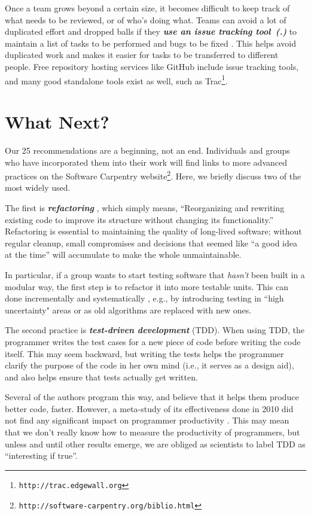 \documentclass{article}
\newcommand{\footurl}[1]{\footnote{\texttt{#1}}}
\newcounter{PracticeIdentifier}[section]
\newcommand{\practice}[1]{\stepcounter{PracticeIdentifier}\textbf{\emph{{#1}~(\arabic{section}.\arabic{PracticeIdentifier})}}}
\begin{document}
Once a team grows beyond a certain size, it becomes difficult to keep
track of what needs to be reviewed, or of who's doing what.  Teams can
avoid a lot of duplicated effort and dropped balls if they
\practice{use an issue tracking tool} to maintain a list of tasks to
be performed and bugs to be fixed \cite{dubois2003a}. This helps avoid
duplicated work and makes it easier for tasks to be transferred to
different people. Free repository hosting services like GitHub include
issue tracking tools, and many good standalone tools exist as well,
such as Trac\footurl{http://trac.edgewall.org}.

\section*{What Next?}

Our 25 recommendations are a beginning, not an end.  Individuals and
groups who have incorporated them into their work will find links to
more advanced practices on the Software Carpentry
website\footurl{http://software-carpentry.org/biblio.html}.  Here,
we briefly discuss two of the most widely used.

The first is \textbf{\emph{refactoring}}
\cite{fowler1999,kerievsky2004}, which simply means, ``Reorganizing
and rewriting existing code to improve its structure without changing
its functionality.''  Refactoring is essential to maintaining the
quality of long-lived software; without regular cleanup, small
compromises and decisions that seemed like ``a good idea at the time''
will accumulate to make the whole unmaintainable.

In particular, if a group wants to start testing software that
\emph{hasn't} been built in a modular way, the first step is to
refactor it into more testable units. This can done incrementally and
systematically \cite{feathers2004}, e.g., by introducing testing in
``high uncertainty" areas or as old algorithms are replaced with new
ones.

The second practice is \textbf{\emph{test-driven development}} (TDD).
When using TDD, the programmer writes the test cases for a new piece
of code before writing the code itself.  This may seem backward, but
writing the tests helps the programmer clarify the purpose of the code
in her own mind (i.e., it serves as a design aid), and also helps
ensure that tests actually get written.

Several of the authors program this way, and believe that it helps
them produce better code, faster.  However, a meta-study of its
effectiveness done in 2010 did not find any significant impact on
programmer productivity \cite{turhan2010}.  This may mean that we
don't really know how to measure the productivity of programmers, but
unless and until other results emerge, we are obliged as scientists to
label TDD as ``interesting if true''.
\end{document}
